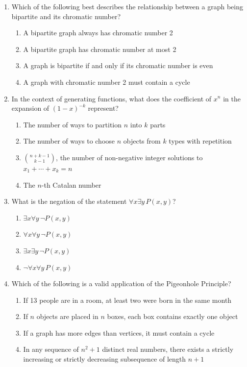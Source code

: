 \documentclass[11pt]{article}
\begin{document}
\begin{enumerate}[label=\textbf{\arabic*.}]

  \item Which of the following best describes the relationship between a graph being bipartite 
  and its chromatic number?
  \begin{enumerate}[label=(\Alph*)]
    \item A bipartite graph always has chromatic number 2
    \item A bipartite graph has chromatic number at most 2
    \item A graph is bipartite if and only if its chromatic number is even
    \item A graph with chromatic number 2 must contain a cycle
  \end{enumerate}

  \item In the context of generating functions, what does the coefficient of $x^n$ in the 
  expansion of $(1-x)^{-k}$ represent?
  \begin{enumerate}[label=(\Alph*)]
    \item The number of ways to partition $n$ into $k$ parts
    \item The number of ways to choose $n$ objects from $k$ types with repetition
    \item $\binom{n+k-1}{k-1}$, the number of non-negative integer solutions to $x_1 + \cdots + x_k = n$
    \item The $n$-th Catalan number
  \end{enumerate}

  \item What is the negation of the statement $\forall x \exists y \, P(x, y)$?
  \begin{enumerate}[label=(\Alph*)]
    \item $\exists x \forall y \, \neg P(x, y)$
    \item $\forall x \forall y \, \neg P(x, y)$
    \item $\exists x \exists y \, \neg P(x, y)$
    \item $\neg \forall x \forall y \, P(x, y)$
  \end{enumerate}

  \item Which of the following is a valid application of the Pigeonhole Principle?
  \begin{enumerate}[label=(\Alph*)]
    \item If 13 people are in a room, at least two were born in the same month
    \item If $n$ objects are placed in $n$ boxes, each box contains exactly one object
    \item If a graph has more edges than vertices, it must contain a cycle
    \item In any sequence of $n^2 + 1$ distinct real numbers, there exists a strictly increasing or strictly decreasing subsequence of length $n+1$
  \end{enumerate}


\end{enumerate}
\end{document}
